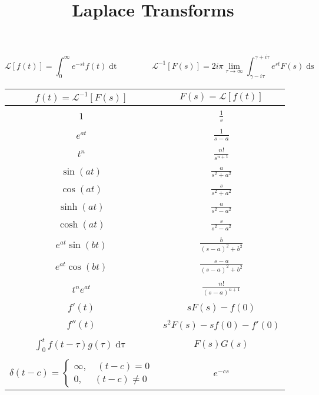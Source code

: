 \documentclass{article}
\title{Laplace Transforms}
\date{}
\newcommand{\Lagr}{\mathscr{L}}
\begin{document}
\maketitle
\[
\Lagr[f(t)] = \int_{0}^{\infty}e^{-st}f(t)\mathop{dt}
\qquad\qquad
\Lagr^{-1}[F(s)] = 2i\pi\lim_{\tau\to\infty}\int_{\gamma - i\tau}^{\gamma + i\tau}e^{st}F(s)\mathop{ds}
\]
\begin{center}
\vspace{1cm}
\begin{tabular}{c c}
$f(t) = \Lagr^{-1}[F(s)]$\qquad\qquad\qquad & \qquad\qquad\qquad$F(s) = \Lagr[f(t)]$\\
\hline \\
$1$ & $\frac{1}{s}$\\
\\
$e^{at}$ & $\frac{1}{s-a}$\\
\\
$t^{n}$ & $\frac{n!}{s^{n+1}}$\\
\\
$\sin{(at)}$ & $\frac{a}{s^{2} + a^{2}}$\\
\\
$\cos{(at)}$ & $\frac{s}{s^{2} + a^{2}}$\\
\\
$\sinh{(at)}$ & $\frac{a}{s^{2} - a^{2}}$\\
\\
$\cosh{(at)}$ & $\frac{s}{s^{2} - a^{2}}$\\
\\
$e^{at}\sin{(bt)}$ & $\frac{b}{(s-a)^{2}+b^{2}}$\\
\\
$e^{at}\cos{(bt)}$ & $\frac{s-a}{(s-a)^{2}+b^{2}}$\\
\\
$t^{n}e^{at}$ & $\frac{n!}{(s-a)^{n+1}}$\\
\\
$f'(t)$ & $sF(s) - f(0)$\\
\\
$f''(t)$ & $s^{2}F(s)-sf(0) - f'(0)$\\
\\
$\int_{0}^{t}f(t-\tau)g(\tau)\mathop{d\tau}$ & $F(s)G(s)$\\
\\
$\delta(t-c) =
\begin{cases}
\infty,\quad (t-c)=0\\
0,\quad\ (t-c)\neq 0
\end{cases}
$ & $e^{-cs}$
\end{tabular}
\end{center}
\end{document}
